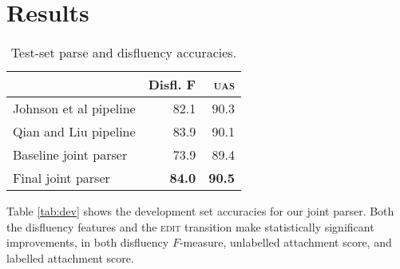 \documentclass[11pt,letterpaper]{article}
\begin{document}


\section{Results}
\label{sec:results}

\begin{table}
    \small
    \centering
    \begin{tabular}{l|r|r}
        & Disfl. F & \textsc{uas} \\
        \hline \hline
Johnson et al pipeline      & 82.1 & 90.3 \\ 
Qian and Liu  pipeline     & 83.9 & 90.1  \\
\hline
Baseline joint parser & 73.9 & 89.4 \\
Final joint parser    & \textbf{84.0} & \textbf{90.5} \\
\hline
    \end{tabular}
    \caption{Test-set parse and disfluency accuracies.\label{tab:test}}
\vspace*{-1.0ex}
\end{table}

Table \ref{tab:dev} shows the development set accuracies for our joint parser.
Both the disfluency features and the 
\textsc{edit} transition make statistically significant improvements, in both
disfluency $F$-measure, unlabelled attachment score, and labelled attachment score.
\end{document}
